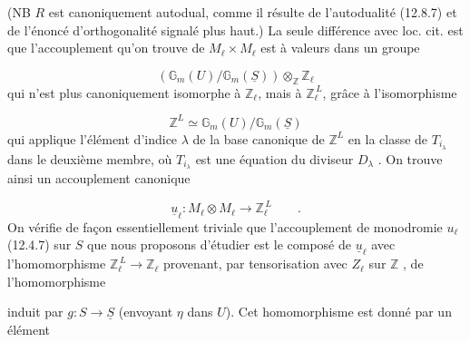 
(NB $R$ est canoniquement autodual, comme il résulte de l'autodualité (12.8.7) et de l'énoncé d'orthogonalité signalé plus haut.) La seule différence avec loc. cit. est que l'accouplement qu'on trouve de $M_\ell \times M_\ell$ est à valeurs dans un groupe

\begin{equation*}
(\mathbb{G}_m(U)/\mathbb{G}_m(\underline{S})) \otimes_{\mathbb{Z}} \mathbb{Z}_\ell
\end{equation*}
qui n'est plus canoniquement isomorphe à $\mathbb{Z}_\ell$, mais à $\mathbb{Z}_\ell^{\,L}$, grâce à l'isomorphisme

\begin{equation}\tag{12.8.10}
\mathbb{Z}^L \simeq \mathbb{G}_m(U)/\mathbb{G}_m(\underline{S})
\end{equation}
qui applique l'élément d'indice $\lambda$ de la base canonique de $\mathbb{Z}^L$ en la classe de $T_{i_\lambda}$ dans le deuxième membre, où $T_{i_\lambda}$ est une équation du diviseur $D_\lambda$ . On trouve ainsi un accouplement canonique

\begin{equation}\tag{12.8.11}
\underline{u}_\ell : M_\ell \otimes M_\ell \longrightarrow \mathbb{Z}_\ell^{\,L} \qquad .
\end{equation}
On vérifie de façon essentiellement triviale que l'accouplement de monodromie $u_\ell$ (12.4.7) sur $S$ que nous proposons d'étudier est le composé de $\underline{u}_\ell$ avec l'homomorphisme $\mathbb{Z}_\ell^{\,L} \longrightarrow \mathbb{Z}_\ell$ provenant, par tensorisation avec $Z_\ell$ sur $\mathbb{Z}$ , de l'homomorphisme

\begin{center}
\end{center}
induit par $g : S \longrightarrow \underline{S}$ (envoyant $\eta$ dans $U$). Cet homomorphisme est donné par un élément


